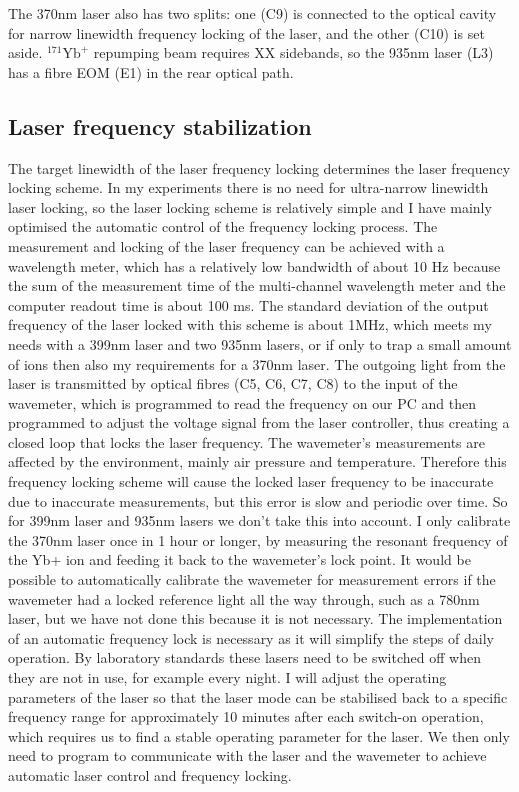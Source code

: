 The 370nm laser also has two splits: one (C9) is connected to the optical cavity for narrow linewidth frequency locking of the laser, and the other (C10) is set aside. ${ }^{171} \mathrm{Yb}^{+}$ repumping beam requires XX sidebands, so the 935nm laser (L3) has a fibre EOM (E1) in the rear optical path.

\subsection{Laser frequency stabilization}

The target linewidth of the laser frequency locking determines the laser frequency locking scheme. In my experiments there is no need for ultra-narrow linewidth laser locking, so the laser locking scheme is relatively simple and I have mainly optimised the automatic control of the frequency locking process. The measurement and locking of the laser frequency can be achieved with a wavelength meter, which has a relatively low bandwidth of about 10 Hz because the sum of the measurement time of the multi-channel wavelength meter and the computer readout time is about 100 ms. The standard deviation of the output frequency of the laser locked with this scheme is about 1MHz, which meets my needs with a 399nm laser and two 935nm lasers, or if only to trap a small amount of ions then also my requirements for a 370nm laser. The outgoing light from the laser is transmitted by optical fibres (C5, C6, C7, C8) to the input of the wavemeter, which is programmed to read the frequency on our PC and then programmed to adjust the voltage signal from the laser controller, thus creating a closed loop that locks the laser frequency. The wavemeter's measurements are affected by the environment, mainly air pressure and temperature. Therefore this frequency locking scheme will cause the locked laser frequency to be inaccurate due to inaccurate measurements, but this error is slow and periodic over time. So for 399nm laser and 935nm lasers we don't take this into account. I only calibrate the 370nm laser once in 1 hour or longer, by measuring the resonant frequency of the Yb+ ion and feeding it back to the wavemeter's lock point. It would be possible to automatically calibrate the wavemeter for measurement errors if the wavemeter had a locked reference light all the way through, such as a 780nm laser, but we have not done this because it is not necessary. The implementation of an automatic frequency lock is necessary as it will simplify the steps of daily operation. By laboratory standards these lasers need to be switched off when they are not in use, for example every night. I will adjust the operating parameters of the laser so that the laser mode can be stabilised back to a specific frequency range for approximately 10 minutes after each switch-on operation, which requires us to find a stable operating parameter for the laser. We then only need to program to communicate with the laser and the wavemeter to achieve automatic laser control and frequency locking.

